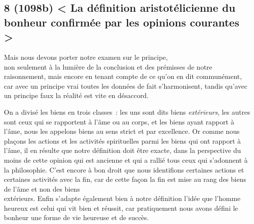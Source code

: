 \documentclass[french,twoside]{book} %
\begin{document}
\subsection[{8 (1098b) < La définition aristotélicienne du bonheur confirmée par les opinions courantes >}]{8 (1098b) < La définition aristotélicienne du bonheur confirmée par les opinions courantes >}
\noindent Mais nous devons porter notre examen sur le principe, \\
non seulement à la lumière de la conclusion et des prémisses de notre raisonnement, mais encore en tenant compte de ce qu’on en dit communément, car avec un principe vrai toutes les données de fait s’harmonisent, tandis qu’avec un principe faux la réalité est vite en désaccord.\par
On a divisé les biens en trois classes : les uns sont dits biens {\itshape extérieurs}, les autres sont ceux qui se rapportent à l’âme ou au corps, et les biens ayant rapport à l’âme, nous les appelons biens au sens strict et par excellence. Or comme nous \\
plaçons les actions et les activités spirituelles parmi les biens qui ont rapport à l’âme, il en résulte que notre définition doit être exacte, dans la perspective du moins de cette opinion qui est ancienne et qui a rallié tous ceux qui s’adonnent à la philosophie. C’est encore à bon droit que nous identifions certaines actions et certaines activités avec la fin, car de cette façon la fin est mise au rang des biens de l’âme et non des biens \\
extérieurs. Enfin s’adapte également bien à notre définition l’idée que l’homme heureux est celui qui vit bien et réussit, car pratiquement nous avons défini le bonheur une forme de vie heureuse et de succès.
\end{document}
